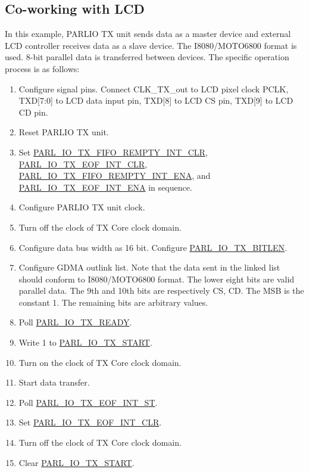 \documentclass[main\_\_EN.tex]{subfiles}
\begin{document}
\subsection{Co-working with LCD}

In this example, PARLIO TX unit sends data as a master device and external LCD controller receives data as a slave device. The I8080/MOTO6800 format is used. 8-bit parallel data is transferred between devices. The specific operation process is as follows:

\begin{enumerate}
    \item Configure signal pins. Connect CLK\_TX\_out to LCD pixel clock PCLK, TXD[7:0] to LCD data input pin, TXD[8] to LCD CS pin, TXD[9] to LCD CD pin.
    \item Reset PARLIO TX unit.
    \item Set \hyperref[fielddesc:PARLIOTXFIFOREMPTYINTCLR]{PARL\_IO\_TX\_FIFO\_REMPTY\_INT\_CLR}, \hyperref[fielddesc:PARLIOTXEOFINTCLR]{PARL\_IO\_TX\_EOF\_INT\_CLR}, \hyperref[fielddesc:PARLIOTXFIFOREMPTYINTENA]{PARL\_IO\_TX\_FIFO\_REMPTY\_INT\_ENA}, and \hyperref[fielddesc:PARLIOTXEOFINTENA]{PARL\_IO\_TX\_EOF\_INT\_ENA} in sequence.
    \item Configure PARLIO TX unit clock.
    \item Turn off the clock of TX Core clock domain.
    \item Configure data bus width as 16 bit. Configure \hyperref[fielddesc:PARLIOTXBITLEN]{PARL\_IO\_TX\_BITLEN}.
    \item Configure GDMA outlink list. Note that the data sent in the linked list should conform to I8080/MOTO6800 format. The lower eight bits are valid parallel data. The 9th and 10th bits are respectively CS, CD. The MSB is the constant 1. The remaining bits are arbitrary values.
    \item Poll \hyperref[fielddesc:PARLIOTXREADY]{PARL\_IO\_TX\_READY}.
    \item Write 1 to \hyperref[fielddesc:PARLIOTXSTART]{PARL\_IO\_TX\_START}.
    \item Turn on the clock of TX Core clock domain.
    \item Start data transfer.
    \item Poll \hyperref[fielddesc:PARLIOTXEOFINTST]{PARL\_IO\_TX\_EOF\_INT\_ST}.
    \item Set \hyperref[fielddesc:PARLIOTXEOFINTCLR]{PARL\_IO\_TX\_EOF\_INT\_CLR}.
    \item Turn off the clock of TX Core clock domain.
    \item Clear \hyperref[fielddesc:PARLIOTXSTART]{PARL\_IO\_TX\_START}.
\end{enumerate}
\end{document}
